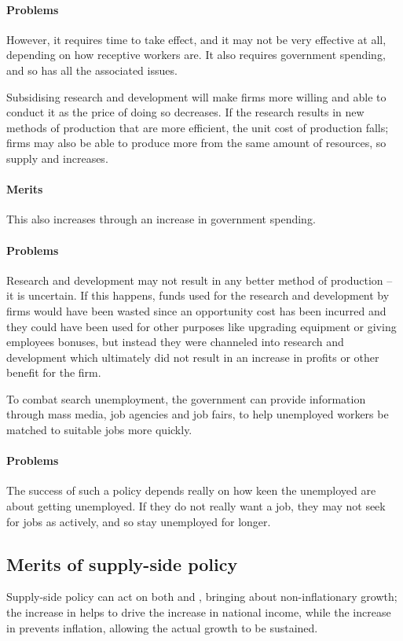 \documentclass[Economics.tex]{subfiles}
\begin{document}
\paragraph{Problems} However, it requires time to take effect, and it may not be very effective at all, depending on how receptive workers are. It also requires government spending, and so has all the associated issues.

Subsidising research and development will make firms more willing and able to conduct it as the price of doing so decreases. If the research results in new methods of production that are more efficient, the unit cost of production falls; firms may also be able to produce more from the same amount of resources, so supply and \AS{} increases. 

\paragraph{Merits} This also increases \AD{} through an increase in government spending.

\paragraph{Problems} Research and development may not result in any better method of production -- it is uncertain. If this happens, funds used for the research and development by firms would have been wasted since an opportunity cost has been incurred and they could have been used for other purposes like upgrading equipment or giving employees bonuses, but instead they were channeled into research and development which ultimately did not result in an increase in profits or other benefit for the firm.

To combat search unemployment, the government can provide information through mass media, job agencies and job fairs, to help unemployed workers be matched to suitable jobs more quickly.

\paragraph{Problems} The success of such a policy depends really on how keen the unemployed are about getting unemployed. If they do not really want a job, they may not seek for jobs as actively, and so stay unemployed for longer.
\subsection{Merits of supply-side policy}
Supply-side policy can act on both \AD{} and \AS{}, bringing about non-inflationary growth; the increase in \AD{} helps to drive the increase in national income, while the increase in \AS{} prevents inflation, allowing the actual growth to be sustained.
\end{document}
